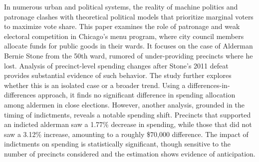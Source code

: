 \begin{spacing}{1.0}
    In numerous urban and political systems, the reality of machine politics and patronage clashes with theoretical political models that prioritize marginal voters to maximize vote share.
    This paper examines the role of patronage and weak electoral competition in Chicago's menu program, where city council members allocate funds for public goods in their wards.
    It focuses on the case of Alderman Bernie Stone from the 50th ward, rumored of under-providing precincts where he lost. Analysis of precinct-level spending changes after Stone's 2011 defeat provides substantial evidence of such behavior. 
    The study further explores whether this is an isolated case or a broader trend. 
    Using a differences-in-differences approach, it finds no significant difference in spending allocation among aldermen in close elections. 
    However, another analysis, grounded in the timing of indictments, reveals a notable spending shift. 
    Precincts that supported an indicted alderman saw a 1.77\% decrease in spending, while those that did not saw a 3.12\% increase, amounting to a roughly \$70,000 difference. 
    The impact of indictments on spending is statistically significant, though sensitive to the number of precincts considered and the estimation shows evidence of anticipation.
\end{spacing}